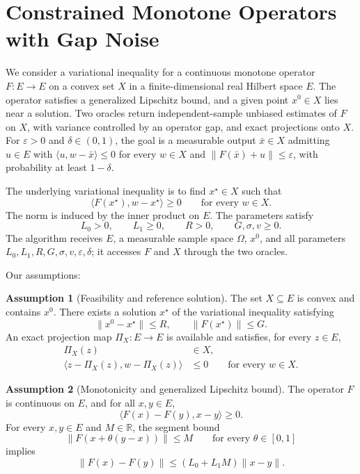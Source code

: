 \documentclass[10pt]{article}
\theoremstyle{definition}
\newtheorem{assumption}{Assumption}
\begin{document}
\section*{Constrained Monotone Operators with Gap Noise}
We consider a variational inequality for a continuous monotone operator $F:E\to E$ on a convex set $X$ in a finite-dimensional real Hilbert space $E$. The operator satisfies a generalized Lipschitz bound, and a given point $x^0\in X$ lies near a solution. Two oracles return independent-sample unbiased estimates of $F$ on $X$, with variance controlled by an operator gap, and exact projections onto $X$. For $\varepsilon>0$ and $\delta\in(0,1)$, the goal is a measurable output $\bar{x}\in X$ admitting $u\in E$ with $\langle u,w-\bar{x}\rangle\leq0$ for every $w\in X$ and $\|F(\bar{x})+u\|\leq\varepsilon$, with probability at least $1-\delta$.

The underlying variational inequality is to find $x^\star\in X$ such that
\[
\langle F(x^\star),w-x^\star\rangle\geq0
\qquad\text{for every }w\in X.
\]
The norm is induced by the inner product on $E$. The parameters satisfy
\[
L_0>0,\qquad L_1\geq0,\qquad R>0,\qquad
G,\sigma,v\geq0.
\]
The algorithm receives $E$, a measurable sample space $\Omega$, $x^0$, and all parameters $L_0,L_1,R,G,\sigma,v,\varepsilon,\delta$; it accesses $F$ and $X$ through the two oracles.

Our assumptions:
\begin{assumption}[Feasibility and reference solution]
The set $X\subseteq E$ is convex and contains $x^0$. There exists a solution $x^\star$ of the variational inequality satisfying
\[
\|x^0-x^\star\|\leq R,
\qquad \|F(x^\star)\|\leq G.
\]
An exact projection map $\Pi_X:E\to E$ is available and satisfies, for every $z\in E$,
\[
\begin{aligned}
\Pi_X(z)&\in X,\\
\langle z-\Pi_X(z),w-\Pi_X(z)\rangle&\leq0
\qquad\text{for every }w\in X.
\end{aligned}
\]
\end{assumption}

\begin{assumption}[Monotonicity and generalized Lipschitz bound]
The operator $F$ is continuous on $E$, and for all $x,y\in E$,
\[
\langle F(x)-F(y),x-y\rangle\geq0.
\]
For every $x,y\in E$ and $M\in\mathbb{R}$, the segment bound
\[
\|F(x+\theta(y-x))\|\leq M
\qquad\text{for every }\theta\in[0,1]
\]
implies
\[
\|F(x)-F(y)\|\leq (L_0+L_1M)\|x-y\|.
\]
\end{assumption}
\end{document}

